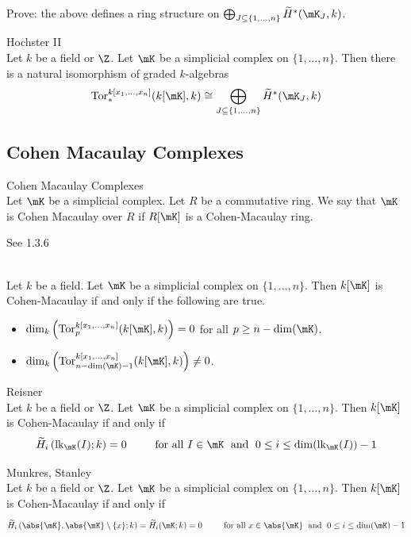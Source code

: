 \documentclass[a4paper]{article}
\begin{document}
Prove: the above defines a ring structure on $\bigoplus_{J\subseteq\{1,\dots,n\}}\widetilde{H}^\ast(\mK_J,k)$. 

\begin{thm}{Hochster II}{}\\
Let $k$ be a field or $\Z$. Let $\mK$ be a simplicial complex on $\{1,\dots,n\}$. Then there is a natural isomorphism of graded $k$-algebras $$\text{Tor}_\ast^{k[x_1,\dots,x_n]}(k[\mK],k)\cong\bigoplus_{J\subseteq\{1,\dots,n\}}\widetilde{H}^\ast(\mK_J,k)$$
\end{thm}

\subsection{Cohen Macaulay Complexes}
\begin{defn}{Cohen Macaulay Complexes}{}\\
Let $\mK$ be a simplicial complex. Let $R$ be a commutative ring. We say that $\mK$ is Cohen Macaulay over $R$ if $R[\mK]$ is a Cohen-Macaulay ring. 
\end{defn}

See 1.3.6

\begin{prp}{}{}\\
Let $k$ be a field. Let $\mK$ be a simplicial complex on $\{1,\dots,n\}$. Then $k[\mK]$ is Cohen-Macaulay if and only if the following are true. 
\begin{itemize}
\item $\dim_k\left(\text{Tor}_p^{k[x_1,\dots,x_n]}(k[\mK],k)\right)=0$ for all $p\geq n-\dim(\mK)$. 
\item $\dim_k\left(\text{Tor}_{n-\dim(\mK)-1}^{k[x_1,\dots,x_n]}(k[\mK],k)\right)\neq 0$. 
\end{itemize}
\end{prp}

\begin{thm}{Reisner}{}\\
Let $k$ be a field or $\Z$. Let $\mK$ be a simplicial complex on $\{1,\dots,n\}$. Then $k[\mK]$ is Cohen-Macaulay if and only if $$\widetilde{H}_i\left(\text{lk}_\mK(I);k\right)=0\;\;\;\;\;\;\;\;\text{ for all }I\in\mK\;\text{ and }\;0\leq i\leq\dim(\text{lk}_\mK(I))-1$$
\end{thm}

\begin{thm}{Munkres, Stanley}{}\\
Let $k$ be a field or $\Z$. Let $\mK$ be a simplicial complex on $\{1,\dots,n\}$. Then $k[\mK]$ is Cohen-Macaulay if and only if $$\widetilde{H}_i\left(\abs{\mK},\abs{\mK}\setminus\{x\};k\right)=\widetilde{H}_i(\mK;k)=0\;\;\;\;\;\;\;\;\text{ for all }x\in\abs{\mK}\;\text{ and }\;0\leq i\leq\dim(\mK)-1$$
\end{thm}
\end{document}

